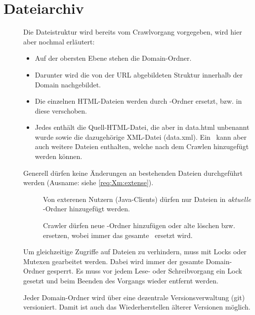 \section{Dateiarchiv} \label{spec:filearchive}
\begin{description}
	\item []
		Die Dateistruktur wird bereits vom Crawlvorgang vorgegeben, wird hier aber nochmal erläutert:
		\begin{itemize}
			\item Auf der obersten Ebene stehen die Domain-Ordner.
			\item Darunter wird die von der URL abgebildeten Struktur
				innerhalb der Domain nachgebildet.
			\item Die einzelnen HTML-Dateien werden durch \htmlarc-Ordner ersetzt, bzw. in diese verschoben.
			\item Jedes \htmlarc enthält die Quell-HTML-Datei, 
				die aber in data.html unbenannt wurde
				sowie die dazugehörige XML-Datei (data.xml). 
				Ein \htmlarc\ kann aber auch weitere Dateien enthalten, welche nach dem
				Crawlen hinzugefügt werden können.
		\end{itemize}
	\item []
		Generell dürfen keine Änderungen an bestehenden Dateien durchgeführt werden 
		(Ausname: siehe \ref{req:Xm:extense}).
		\begin{description}
			\item []
				Von exterenen Nutzern (Java-Clients) dürfen nur Dateien in \emph{aktuelle} \htmlarc-Ordner
				hinzugefügt werden.
			\item []
				Crawler dürfen neue \htmlarc-Ordner hinzufügen oder alte löschen bzw. ersetzen, 
				wobei immer das gesamte \htmlarc\ ersetzt wird. 
		\end{description}
	\item []
		Um gleichzeitige Zugriffe auf Dateien zu verhindern, 
		muss mit Locks oder Mutexen gearbeitet werden.
		Dabei wird immer der gesamte Domain-Ordner gesperrt.
		Es muss vor jedem Lese- oder Schreibvorgang ein Lock gesetzt und
		beim Beenden des Vorgangs wieder entfernt werden.
	\item []	
		Jeder Domain-Ordner wird über eine dezentrale Versionsverwaltung (git) versioniert. 
		Damit ist auch das Wiederherstellen älterer Versionen möglich.
		\begin{description}

\end{description}
\end{description}
